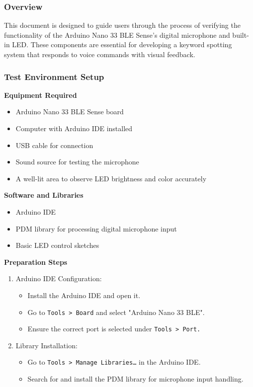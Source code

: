 \subsubsection{Overview}
This document is designed to guide users through the process of verifying the functionality of the Arduino Nano 33 BLE Sense's digital microphone and built-in LED. These components are essential for developing a keyword spotting system that responds to voice commands with visual feedback.

\subsubsection{Test Environment Setup}

\textbf{Equipment Required}

\begin{itemize}
	\item Arduino Nano 33 BLE Sense board
	\item Computer with Arduino IDE installed
	\item USB cable for connection
	\item Sound source for testing the microphone
	\item A well-lit area to observe LED brightness and color accurately
\end{itemize}

\bigskip

\textbf{Software and Libraries}

\begin{itemize}
	\item Arduino IDE 
	\item PDM library for processing digital microphone input
	\item Basic LED control sketches 
\end{itemize}
	
\textbf{Preparation Steps}

\begin{enumerate}
	\item Arduino IDE Configuration:
	\begin{itemize}
		\item Install the Arduino IDE and open it.
		\item Go to \texttt{Tools > Board} and select "Arduino Nano 33 BLE".
		\item Ensure the correct port is selected under \texttt{Tools > Port.}
	\end{itemize}
	\item Library Installation:
	\begin{itemize}
		\item Go to \texttt{Tools > Manage Libraries…} in the Arduino IDE.
		\item Search for and install the PDM library for microphone input handling.
	\end{itemize}
\end{enumerate}

